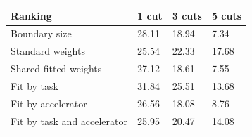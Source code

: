 \begin{tabular}{@{}llll@{}}
\toprule
Ranking & 1 cut & 3 cuts & 5 cuts \\
\midrule
Boundary size & 28.11 & 18.94 & 7.34 \\
Standard weights & 25.54 & 22.33 & 17.68 \\
Shared fitted weights & 27.12 & 18.61 & 7.55 \\
Fit by task & 31.84 & 25.51 & 13.68 \\
Fit by accelerator & 26.56 & 18.08 & 8.76 \\
Fit by task and accelerator & 25.95 & 20.47 & 14.08 \\
\bottomrule
\end{tabular}
